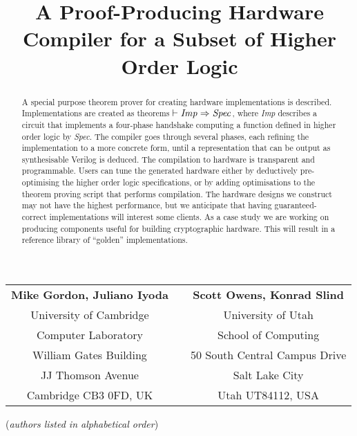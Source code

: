 \documentclass{llncs}
\title{A Proof-Producing Hardware Compiler for a Subset of Higher Order Logic}
\author{}
\institute{}
\begin{document}
\maketitle

\vspace*{-8mm}

\begin{center}
\begin{tabular}{ccc}
{\bf Mike Gordon, Juliano Iyoda} &\hspace*{5mm}& {\bf Scott Owens, Konrad Slind}\\
University of Cambridge          &\hspace*{5mm}& University of Utah\\
Computer Laboratory              &\hspace*{5mm}& School of Computing\\
William Gates Building           &\hspace*{5mm}& 50 South Central Campus Drive\\
JJ Thomson Avenue                &\hspace*{5mm}& Salt Lake City\\
Cambridge CB3 0FD, UK            &\hspace*{5mm}& Utah UT84112, USA
\end{tabular}


\vspace*{2mm}

({\it{authors listed in alphabetical order\/}})
\end{center}

\vspace*{-5mm}

\thispagestyle{empty}

\begin{abstract}
A special purpose theorem prover for creating hardware implementations
is described.  Implementations are created as theorems
$\vdash {\it{Imp}}\Rightarrow{\it{Spec}}$, where {\it{Imp}}
describes a circuit that implements a four-phase handshake computing
a function defined in higher order logic by {\it{Spec}}.  The compiler
goes through several phases, each refining the implementation to a
more concrete form, until a representation that can be output as
synthesisable Verilog is deduced.  The compilation to hardware is
transparent and programmable. Users can tune the generated hardware
either by deductively pre-optimising the higher order logic
specifications, or by adding optimisations to the theorem proving
script that performs compilation.  The hardware designs we construct
may not have the highest performance, but we anticipate that having
guaranteed-correct implementations will interest some clients.  As a
case study we are working on producing components useful for building
cryptographic hardware.  This will result in a reference library of
``golden'' implementations.


\end{abstract}
\end{document}

